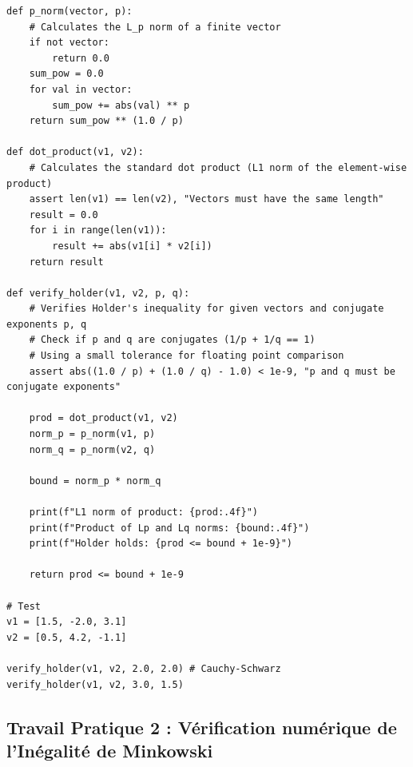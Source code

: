 \documentclass[11pt,a4paper]{article}
\begin{document}
\begin{lstlisting}
def p_norm(vector, p):
    # Calculates the L_p norm of a finite vector
    if not vector:
        return 0.0
    sum_pow = 0.0
    for val in vector:
        sum_pow += abs(val) ** p
    return sum_pow ** (1.0 / p)

def dot_product(v1, v2):
    # Calculates the standard dot product (L1 norm of the element-wise product)
    assert len(v1) == len(v2), "Vectors must have the same length"
    result = 0.0
    for i in range(len(v1)):
        result += abs(v1[i] * v2[i])
    return result

def verify_holder(v1, v2, p, q):
    # Verifies Holder's inequality for given vectors and conjugate exponents p, q
    # Check if p and q are conjugates (1/p + 1/q == 1)
    # Using a small tolerance for floating point comparison
    assert abs((1.0 / p) + (1.0 / q) - 1.0) < 1e-9, "p and q must be conjugate exponents"

    prod = dot_product(v1, v2)
    norm_p = p_norm(v1, p)
    norm_q = p_norm(v2, q)

    bound = norm_p * norm_q

    print(f"L1 norm of product: {prod:.4f}")
    print(f"Product of Lp and Lq norms: {bound:.4f}")
    print(f"Holder holds: {prod <= bound + 1e-9}")

    return prod <= bound + 1e-9

# Test
v1 = [1.5, -2.0, 3.1]
v2 = [0.5, 4.2, -1.1]

verify_holder(v1, v2, 2.0, 2.0) # Cauchy-Schwarz
verify_holder(v1, v2, 3.0, 1.5)
\end{lstlisting}


\subsection*{Travail Pratique 2 : Vérification numérique de l'Inégalité de Minkowski}
\end{document}
